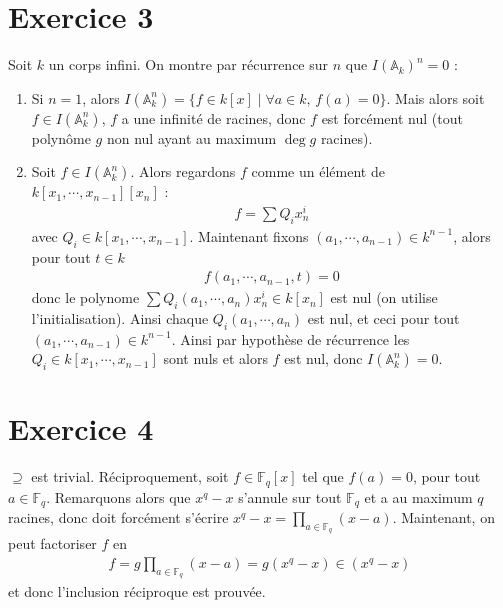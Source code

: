     \section{Exercice 3}
        Soit $k$ un corps infini. On montre par récurrence sur $n$ que $I(\mathbb{A}_k)^n = 0$ :
        \begin{enumerate}
            \item Si $n = 1$, alors $I(\mathbb{A}_k^n) = \{f \in k[x] \mid \forall a \in k,\, f(a) = 0\}$. Mais alors soit $f \in I(\mathbb{A}_k^n)$, $f$ a une infinité de racines, donc $f$ est forcément nul (tout polynôme $g$ non nul ayant au maximum $\deg g$ racines).
            \item Soit $f \in I(\mathbb{A}_k^n)$. Alors regardons $f$ comme un élément de $k[x_1, \cdots, x_{n-1}][x_n]$ : 
            \begin{align*}
                f = \sum Q_i x_n^i
            \end{align*}
            avec $Q_i \in k[x_1, \cdots, x_{n-1}]$. Maintenant fixons $(a_1, \cdots, a_{n-1}) \in k^{n-1}$, alors pour tout $t \in k$
            \begin{align*}
                f(a_1, \cdots, a_{n-1}, t) = 0
            \end{align*}
            donc le polynome $\sum Q_i(a_1, \cdots, a_n)x_n^i \in k[x_n]$ est nul (on utilise l'initialisation). Ainsi chaque $Q_i(a_1, \cdots, a_n)$ est nul, et ceci pour tout $(a_1, \cdots, a_{n-1}) \in k^{n-1}$. Ainsi par hypothèse de récurrence les $Q_i \in k[x_1, \cdots, x_{n-1}]$ sont nuls et alors $f$ est nul, donc $I(\mathbb{A}_k^n) = 0$.
        \end{enumerate}
    
    \section{Exercice 4}
        $\supseteq$ est trivial. Réciproquement, soit $f \in \mathbb{F}_q[x]$ tel que $f(a) = 0$, pour tout $a \in \mathbb{F}_q$. Remarquons alors que $x^q - x$ s'annule sur tout $\mathbb{F}_q$ et a au maximum $q$ racines, donc doit forcément s'écrire $x^q - x = \prod_{a \in \mathbb{F}_q} (x - a)$. Maintenant, on peut factoriser $f$ en
        \begin{align*}
            f = g \prod_{a \in \mathbb{F}_q} (x - a) = g (x^q - x) \in (x^q - x)
        \end{align*}
        et donc l'inclusion réciproque est prouvée.

